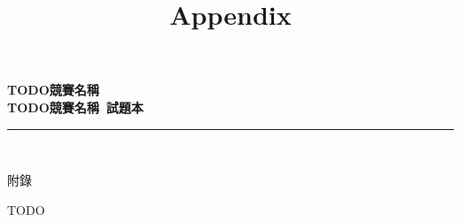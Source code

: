 \documentclass[a4paper]{article}
\title{Appendix}
\begin{document}
\begin{center}
\textbf{\huge TODO競賽名稱}\\
\vspace{5mm}
\textbf{\huge TODO競賽名稱\ 試題本}\\
\vspace{10mm}
\rule{17cm}{2pt}\\
\vspace{5mm}

\huge 附錄\\
\end{center}

\fontsize{14pt}{20pt}\selectfont

\noindent TODO
\end{document}
